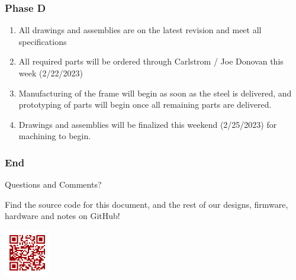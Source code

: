 \documentclass[aspectratio=169]{beamer}
\begin{document}
\begin{frame}
    \frametitle{Phase D}

    \begin{enumerate}
        \item All drawings and assemblies are on the latest revision and meet all specifications
        \item All required parts will be ordered through Carlstrom / Joe Donovan this week (2/22/2023)
        \item Manufacturing of the frame will begin as soon as the steel is delivered, and prototyping of parts will begin once all remaining parts are delivered.
        \item Drawings and assemblies will be finalized this weekend (2/25/2023) for machining to begin.
    \end{enumerate}


\end{frame}

\begin{frame}
    \frametitle{End}

    \begin{block}{}
        \begin{center}
            \Huge Questions and Comments?
        \end{center}
    \end{block}

    \begin{center}
        Find the source code for this document, and the rest of our designs, firmware, hardware
        and notes on GitHub!

        \includegraphics[height=2cm]{github_qr}
    \end{center}

\end{frame}
\end{document}
